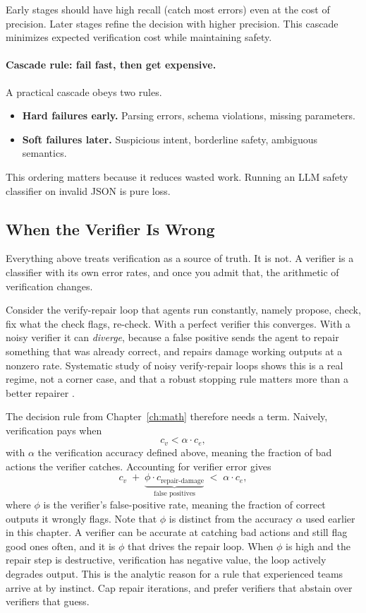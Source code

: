 Early stages should have high recall (catch most errors) even at the cost of precision. Later stages refine the decision with higher precision. This cascade minimizes expected verification cost while maintaining safety.

\paragraph{Cascade rule: fail fast, then get expensive.}
A practical cascade obeys two rules.
\begin{itemize}
\item \textbf{Hard failures early.} Parsing errors, schema violations, missing parameters.
\item \textbf{Soft failures later.} Suspicious intent, borderline safety, ambiguous semantics.
\end{itemize}
This ordering matters because it reduces wasted work. Running an LLM safety classifier on invalid JSON is pure loss.

\subsection{When the Verifier Is Wrong}

Everything above treats verification as a source of truth. It is not. A verifier
is a classifier with its own error rates, and once you admit that, the arithmetic
of verification changes.

Consider the verify-repair loop that agents run constantly, namely propose, check, fix
what the check flags, re-check. With a perfect verifier this converges. With a
noisy verifier it can \emph{diverge}, because a false positive sends the agent to
repair something that was already correct, and repairs damage working outputs at
a nonzero rate. Systematic study of noisy verify-repair loops shows this is a real
regime, not a corner case, and that a robust stopping rule matters more than a
better repairer \cite{verifyrepair2026}.

The decision rule from Chapter~\ref{ch:math} therefore needs a term. Naively, verification pays when
\[
c_v < \alpha \cdot c_e,
\]
with $\alpha$ the verification accuracy defined above, meaning the fraction of bad
actions the verifier catches. Accounting for verifier error gives
\[
c_v \;+\; \underbrace{\phi \cdot c_{\text{repair-damage}}}_{\text{false positives}} \;<\; \alpha \cdot c_e,
\]
where $\phi$ is the verifier's false-positive rate, meaning the fraction of correct
outputs it wrongly flags. Note that $\phi$ is distinct from the accuracy $\alpha$
used earlier in this chapter. A verifier can be accurate at catching bad actions
and still flag good ones often, and it is $\phi$ that drives the repair loop.
When $\phi$ is high and the repair step is destructive, verification has negative value, the loop actively
degrades output. This is the analytic reason for a rule that experienced teams
arrive at by instinct. Cap repair iterations, and prefer verifiers that abstain
over verifiers that guess.

